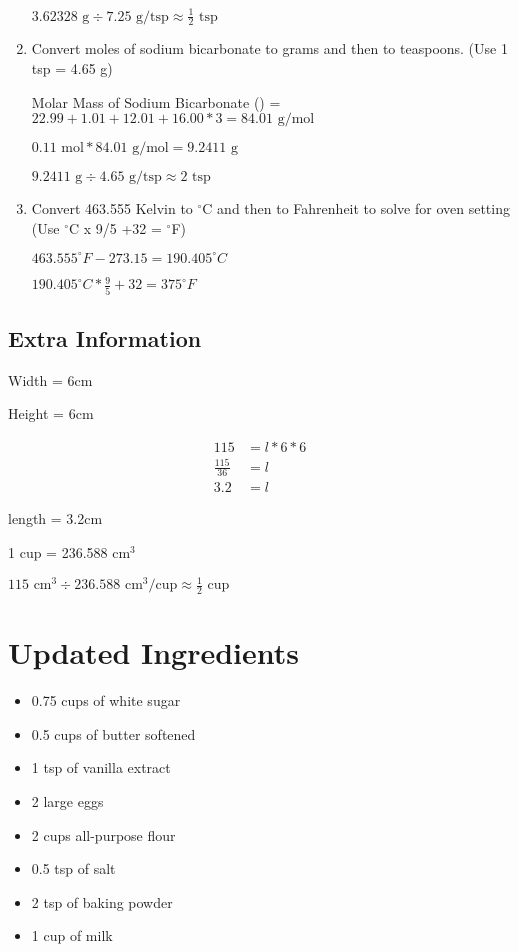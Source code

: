 \documentclass[10pt]{article}
\begin{document}
\begin{enumerate}
        $3.62328\text{ g}\div 7.25\text{ g/tsp}\approx \frac{1}{2}\text{ tsp}$
    \item Convert moles of sodium bicarbonate to grams and then to teaspoons. (Use 1 tsp = 4.65 g)
    
        Molar Mass of Sodium Bicarbonate () = $22.99+1.01+12.01+16.00*3=84.01\text{ g/mol}$

        $0.11 \text{ mol}*84.01\text{ g/mol}=9.2411\text{ g}$

        $9.2411 \text{ g}\div 4.65\text{ g/tsp}\approx 2\text{ tsp}$
    \item Convert 463.555 Kelvin to $^{\circ}$C and then to Fahrenheit to solve for oven setting (Use $^{\circ}$C x 9/5 +32 = $^{\circ}$F)

        $463.555^{\circ}F-273.15=190.405^{\circ}C$

        $190.405^{\circ}C * \frac{9}{5} +32 = 375^{\circ}F$
\end{enumerate}
\subsection{Extra Information}
Width = 6cm

\noindent Height = 6cm

\begin{align*}
    115&=l*6*6\\
    \frac{115}{36}&=l\\
    3.2&=l
\end{align*}

length = 3.2cm

1 cup = 236.588 cm$^3$

$115 \text{ cm}^3 \div 236.588 \text{ cm}^3\text{/cup} \approx \frac{1}{2}\text{ cup}$

\section{Updated Ingredients}

\begin{itemize}
    \item 0.75 cups of white sugar
    \item 0.5 cups of butter softened
    \item 1 tsp of vanilla extract
    \item 2 large eggs
    \item 2 cups all-purpose flour
    \item 0.5 tsp of salt
    \item 2 tsp of baking powder
    \item 1 cup of milk
\end{itemize}
\end{document}
